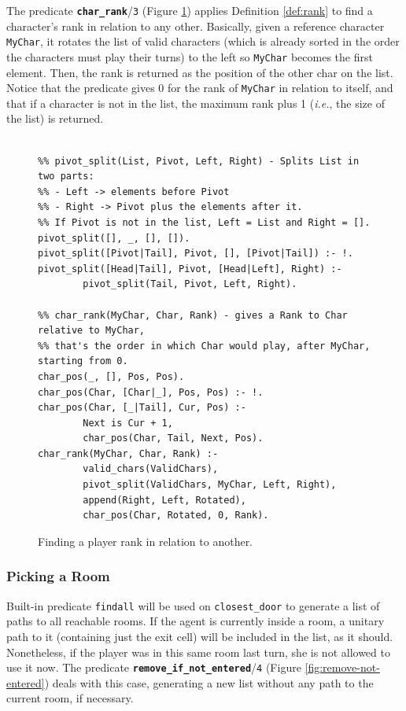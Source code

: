 \documentclass[12pt,a4paper]{article}
\newcommand{\varname}[1]{\texttt{#1}}
\newcommand{\varnamebf}[1]{\textbf{\texttt{#1}}}
\newcommand{\predprot}[2]{{\color{MidnightBlue}\varnamebf{#1}}/{\color{Mulberry}\varname{#2}}}
\newcommand{\predname}[1]{{\color{MidnightBlue}\varname{#1}}}
\begin{document}
The predicate \predprot{char\_rank}{3} (Figure \ref{fig:char-rank}) applies Definition \ref{def:rank} to find a character's rank in relation to any other. Basically, given a reference character \varname{MyChar}, it rotates the list of valid characters (which is already sorted in the order the characters must play their turns) to the left so \varname{MyChar} becomes the first element. Then, the rank is returned as the position of the other char on the list. Notice that the predicate gives 0 for the rank of \varname{MyChar} in relation to itself, and that if a character is not in the list, the maximum rank plus 1 (\textit{i.e.}, the size of the list) is returned.

\begin{figure}[H]
	\centering
\begin{lstlisting}[style=Prolog-pygsty]
%%% Player rank.

%% pivot_split(List, Pivot, Left, Right) - Splits List in two parts:
%% - Left -> elements before Pivot
%% - Right -> Pivot plus the elements after it.
%% If Pivot is not in the list, Left = List and Right = [].
pivot_split([], _, [], []).
pivot_split([Pivot|Tail], Pivot, [], [Pivot|Tail]) :- !.
pivot_split([Head|Tail], Pivot, [Head|Left], Right) :-
		pivot_split(Tail, Pivot, Left, Right).

%% char_rank(MyChar, Char, Rank) - gives a Rank to Char relative to MyChar,
%% that's the order in which Char would play, after MyChar, starting from 0.
char_pos(_, [], Pos, Pos).
char_pos(Char, [Char|_], Pos, Pos) :- !.
char_pos(Char, [_|Tail], Cur, Pos) :-
		Next is Cur + 1,
		char_pos(Char, Tail, Next, Pos).
char_rank(MyChar, Char, Rank) :-
		valid_chars(ValidChars),
		pivot_split(ValidChars, MyChar, Left, Right),
		append(Right, Left, Rotated),
		char_pos(Char, Rotated, 0, Rank).
\end{lstlisting}
	\caption{Finding a player rank in relation to another.} 
	\label{fig:char-rank}
\end{figure}

\subsubsection{Picking a Room}
\label{sec:pick-room}

Built-in predicate \predname{findall} will be used on \predname{closest\_door} to generate a list of paths to all reachable rooms. If the agent is currently inside a room, a unitary path to it (containing just the exit cell) will be included in the list, as it should. Nonetheless, if the player was in this same room last turn, she is not allowed to use it now. The predicate \predprot{remove\_if\_not\_entered}{4} (Figure \ref{fig:remove-not-entered}) deals with this case, generating a new list without any path to the current room, if necessary.
\end{document}
